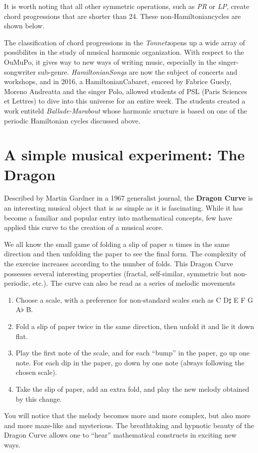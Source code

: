 \documentclass{article}
\newcommand{\Tonnetz}{\emph{Tonnetz}}
\newcommand{\Hamiltonian}{Hamiltonian}
\begin{document}
It is worth noting that all other symmetric operations, such as \emph{PR} or
\emph{LP}, create chord progressions that are shorter than 24.  These
non-\Hamiltonian cycles are shown below.

The classification of chord progressions in the \Tonnetz opens up a wide
array of possibilites in the study of musical harmonic organization.  With
respect to the OuMuPo, it gives way to new ways of writing music, especially
in the singer-songwriter sub-genre.  \emph{\Hamiltonian Songs} are now the
subject of concerts and workshops, and in 2016, a \Hamiltonian Cabaret,
emceed by Fabrice Guedy, Moreno Andreatta and the singer Polo, allowed
students of PSL (Paris Sciences et Lettres) to dive into this universe for
an entire week.  The students created a work entiteld \emph{Ballade-Marabout}
whose harmonic sructure is based on one of the periodic Hamiltonian cycles
discussed above.

\section*{A simple musical experiment: The Dragon}
Described by Martin Gardner in a 1967 generalist journal, the \textbf{Dragon
Curve} is an interesting musical object that is as simple as it is
fascinating.  While it has become a familiar and popular entry into
mathematical concepts, few have applied this curve to the creation of a
musical score.

We all know the small game of folding a slip of paper $n$ times in the same
direction and then unfolding the paper to see the final form.  The
complexity of the exercise increases according to the number of folds.  This
Dragon Curve possesses several interesting properties (fractal,
self-similar, symmetric but non-periodic, etc.).  The curve can also be read
as a series of melodic movements
\begin{enumerate}
\item Choose a scale, with a preference for non-standard scales such as C
D$\sharp$ E F G A$\flat$ B.
\item Fold a slip of paper twice in the same direction, then unfold it and
lie it down flat.
\item Play the first note of the scale, and for each ``bump'' in the paper,
go up one note.  For each dip in the paper, go down by one note (always
following the chosen scale).
\item Take the slip of paper, add an extra fold, and play the new melody
obtained by this change.
\end{enumerate}
You will notice that the melody becomes more and more complex, but also more
and more maze-like and mysterious.  The breathtaking and hypnotic beauty of
the Dragon Curve allows one to ``hear'' mathematical constructs in exciting
new ways.
\end{document}
